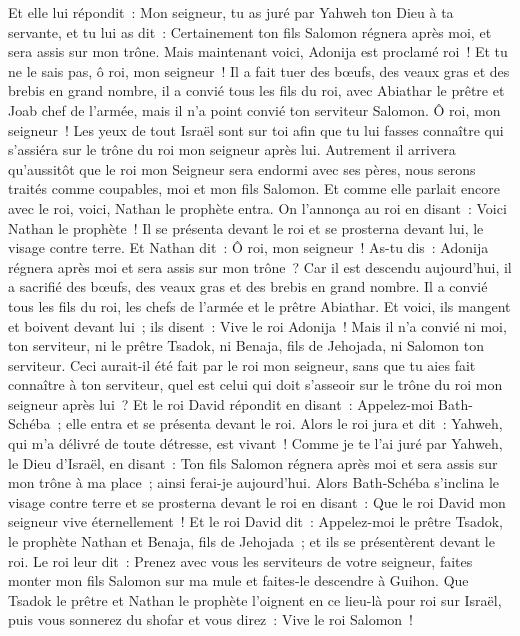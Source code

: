 \begin{multicols}{2}
Et elle lui répondit~: Mon seigneur, tu as juré par Yahweh ton Dieu à ta servante, et tu lui as dit~: Certainement ton fils Salomon régnera après moi, et sera assis sur mon trône. 
Mais maintenant voici, Adonija est proclamé roi~! Et tu ne le sais pas, ô roi, mon seigneur~!
Il a fait tuer des bœufs, des veaux gras et des brebis en grand nombre, il a convié tous les fils du roi, avec Abiathar le prêtre et Joab chef de l'armée, mais il n'a point convié ton serviteur Salomon.
Ô roi, mon seigneur~! Les yeux de tout Israël sont sur toi afin que tu lui fasses connaître qui s'assiéra sur le trône du roi mon seigneur après lui.
Autrement il arrivera qu'aussitôt que le roi mon Seigneur sera endormi avec ses pères, nous serons traités comme coupables, moi et mon fils Salomon. 
Et comme elle parlait encore avec le roi, voici, Nathan le prophète entra.
On l'annonça au roi en disant~: Voici Nathan le prophète~! Il se présenta devant le roi et se prosterna devant lui, le visage contre terre.
Et Nathan dit~: Ô roi, mon seigneur~! As-tu dis~: Adonija régnera après moi et sera assis sur mon trône~?
Car il est descendu aujourd'hui, il a sacrifié des bœufs, des veaux gras et des brebis en grand nombre. Il a convié tous les fils du roi, les chefs de l'armée et le prêtre Abiathar. Et voici, ils mangent et boivent devant lui~; ils disent~: Vive le roi Adonija~!
Mais il n'a convié ni moi, ton serviteur, ni le prêtre Tsadok, ni Benaja, fils de Jehojada, ni Salomon ton serviteur.
Ceci aurait-il été fait par le roi mon seigneur, sans que tu aies fait connaître à ton serviteur, quel est celui qui doit s'asseoir sur le trône du roi mon seigneur après lui~?
Et le roi David répondit en disant~: Appelez-moi Bath-Schéba~; elle entra et se présenta devant le roi.
Alors le roi jura et dit~: Yahweh, qui m'a délivré de toute détresse, est vivant~!
Comme je te l'ai juré par Yahweh, le Dieu d'Israël, en disant~: Ton fils Salomon régnera après moi et sera assis sur mon trône à ma place~; ainsi ferai-je aujourd'hui.
Alors Bath-Schéba s'inclina le visage contre terre et se prosterna devant le roi en disant~: Que le roi David mon seigneur vive éternellement~!
Et le roi David dit~: Appelez-moi le prêtre Tsadok, le prophète Nathan et Benaja, fils de Jehojada~; et ils se présentèrent devant le roi.
Le roi leur dit~: Prenez avec vous les serviteurs de votre seigneur, faites monter mon fils Salomon sur ma mule et faites-le descendre à Guihon.
Que Tsadok le prêtre et Nathan le prophète l'oignent en ce lieu-là pour roi sur Israël, puis vous sonnerez du shofar et vous direz~: Vive le roi Salomon~!

\end{multicols}
